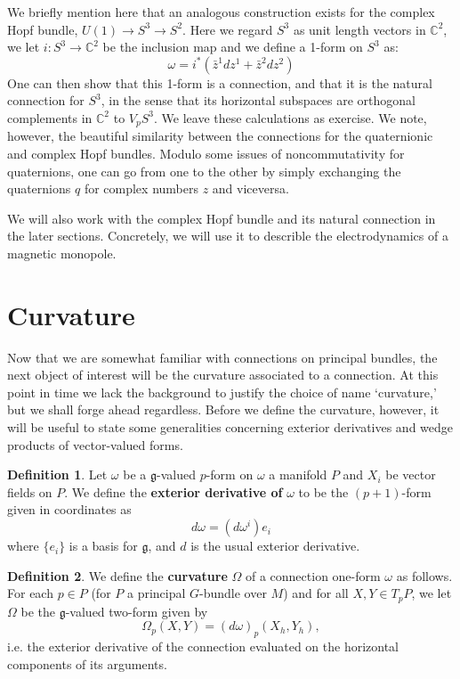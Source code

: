 \documentclass{book}
\newcommand{\C}{\mathbb{C}}
\newcommand{\fr}{\mathfrak}
\theoremstyle{plain}
\theoremstyle{definition}
\newtheorem{defn}{Definition}
\theoremstyle{remark}
\begin{document}
We briefly mention here that an analogous construction exists for the complex Hopf bundle, $U(1) \to S^3 \to S^2$. Here we regard $S^3$ as unit length vectors in $\C^2$, we let $i:S^3 \to \C^2$ be the inclusion map and we define a 1-form on $S^3$ as:
\[       \omega = i^* (\bar z^1 dz^1 + \bar z^2 dz^2)       \]
One can then show that this 1-form is a connection, and that it is the natural connection for $S^3$, in the sense that its horizontal subspaces are orthogonal complements in $\C^2$ to $V_p S^3$. We leave these calculations as exercise. We note, however, the beautiful similarity between the connections for the quaternionic and complex Hopf bundles. Modulo some issues of noncommutativity for quaternions, one can go from one to the other by simply exchanging the quaternions $q$ for complex numbers $z$ and viceversa.

We will also work with the complex Hopf bundle and its natural connection in the later sections. Concretely, we will use it to describle the electrodynamics of a magnetic monopole.


















\section{Curvature}

Now that we are somewhat familiar with connections on principal bundles, the next object
of interest will be the curvature associated to a connection. At this point in time we lack
the background to justify the choice of name `curvature,' but we shall forge ahead regardless. 
Before we define the curvature, however, it will be useful to state some generalities concerning
exterior derivatives and wedge products of vector-valued forms.

\begin{defn}
Let $\omega$ be a $\fr g$-valued $p$-form on $\omega$ a manifold $P$ and $X_i$ be vector fields on $P$.
We define the \textbf{exterior derivative of} $\omega$ to be the $(p+1)$-form given in coordinates as
\[d\omega = (d\omega^i)e_i\]
where $\{e_i\}$ is a basis for $\fr g$, and $d$ is the usual exterior derivative.
\end{defn}

\begin{defn}
We define the \textbf{curvature} $\Omega$ of a connection one-form $\omega$ as follows. For each $p\in P$ (for $P$ a principal $G$-bundle over $M$) and for all $X,Y\in T_pP$, we let $\Omega$ be the $\fr g$-valued two-form given by
\[\Omega_p(X,Y)=(d\omega)_p(X_h,Y_h),\]
i.e. the exterior derivative of the connection evaluated on the horizontal components of its arguments.
\end{defn}
\end{document}
